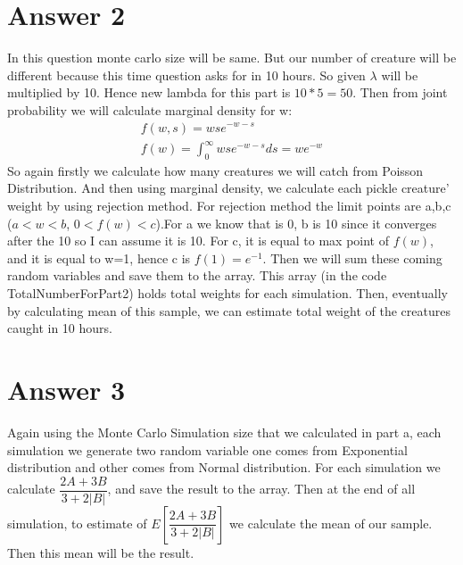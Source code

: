 \documentclass[12pt]{article}
\begin{document}
\section*{Answer 2}
In this question monte carlo size will be same. But our number of creature will be different because this time question asks for in 10 hours. So given $\lambda$ will be multiplied by 10. Hence new lambda for this part is $10*5=50$. Then from joint probability we will calculate marginal density for w:
\begin{gather*}
    f(w,s) = wse^{-w-s} \\
    f(w) = \int^{\infty}_0 wse^{-w-s}ds = we^{-w}
\end{gather*}
So again firstly we calculate how many creatures we will catch from Poisson Distribution. And then using marginal density, we calculate each pickle creature' weight by using rejection method. For rejection method the limit points are a,b,c ($a<w<b$, $0<f(w)<c$).For a we know that is 0, b is 10 since it converges after the 10 so I can assume it is 10. For c, it is equal to max point of $f(w)$, and it is equal to w=1, hence c is $f(1)=e^{-1}$. Then we will sum these coming random variables and save them to the array. This array (in the code TotalNumberForPart2) holds total weights for each simulation. Then, eventually by calculating mean of this sample, we can estimate total weight of the creatures caught in 10 hours.
\section*{Answer 3}
Again using the Monte Carlo Simulation size that we calculated in part a, each simulation we generate two random variable one comes from Exponential distribution and other comes from Normal distribution. For each simulation we calculate $\dfrac{2A+3B}{3+2|B|}$, and save the result to the array. Then at the end of all simulation, to estimate of $E[\dfrac{2A+3B}{3+2|B|}]$ we calculate the mean of our sample. Then this mean will be the result.
\end{document}
